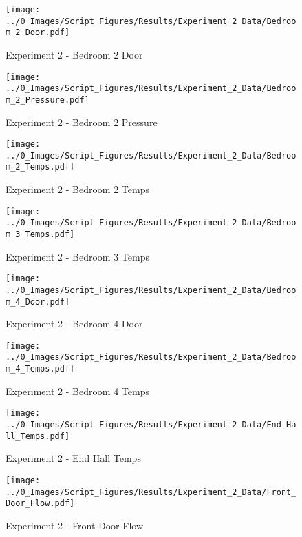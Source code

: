 	\clearpage

	\begin{figure}[H]
		\centering
		\texttt{[image: ../0\_Images/Script\_Figures/Results/Experiment\_2\_Data/Bedroom\_2\_Door.pdf]}
		\caption[]{Experiment 2 - Bedroom 2 Door}
	\end{figure}
 

	\begin{figure}[H]
		\centering
		\texttt{[image: ../0\_Images/Script\_Figures/Results/Experiment\_2\_Data/Bedroom\_2\_Pressure.pdf]}
		\caption[]{Experiment 2 - Bedroom 2 Pressure}
	\end{figure}
 
	\clearpage

	\begin{figure}[H]
		\centering
		\texttt{[image: ../0\_Images/Script\_Figures/Results/Experiment\_2\_Data/Bedroom\_2\_Temps.pdf]}
		\caption[]{Experiment 2 - Bedroom 2 Temps}
	\end{figure}
 

	\begin{figure}[H]
		\centering
		\texttt{[image: ../0\_Images/Script\_Figures/Results/Experiment\_2\_Data/Bedroom\_3\_Temps.pdf]}
		\caption[]{Experiment 2 - Bedroom 3 Temps}
	\end{figure}
 
	\clearpage

	\begin{figure}[H]
		\centering
		\texttt{[image: ../0\_Images/Script\_Figures/Results/Experiment\_2\_Data/Bedroom\_4\_Door.pdf]}
		\caption[]{Experiment 2 - Bedroom 4 Door}
	\end{figure}
 

	\begin{figure}[H]
		\centering
		\texttt{[image: ../0\_Images/Script\_Figures/Results/Experiment\_2\_Data/Bedroom\_4\_Temps.pdf]}
		\caption[]{Experiment 2 - Bedroom 4 Temps}
	\end{figure}
 
	\clearpage

	\begin{figure}[H]
		\centering
		\texttt{[image: ../0\_Images/Script\_Figures/Results/Experiment\_2\_Data/End\_Hall\_Temps.pdf]}
		\caption[]{Experiment 2 - End Hall Temps}
	\end{figure}
 

	\begin{figure}[H]
		\centering
		\texttt{[image: ../0\_Images/Script\_Figures/Results/Experiment\_2\_Data/Front\_Door\_Flow.pdf]}
		\caption[]{Experiment 2 - Front Door Flow}
	\end{figure}
 
